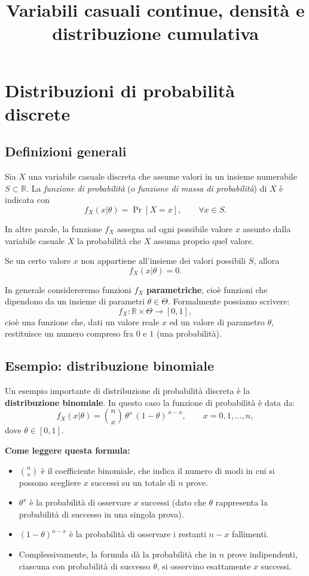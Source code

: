 \documentclass[a4paper,12pt]{article}
\title{Variabili casuali continue, densità e distribuzione cumulativa}
\author{}
\date{}
\begin{document}
	
	\maketitle
	
	\section*{Distribuzioni di probabilità discrete}
	
	\subsection*{Definizioni generali}
	
	Sia $X$ una variabile casuale discreta che assume valori in un insieme numerabile $S \subset \mathbb{R}$.
	La \textit{funzione di probabilità} (o \textit{funzione di massa di probabilità}) di $X$ è indicata con
	\[
	f_X(x|\theta) = \Pr[X = x], \qquad \forall x \in S.
	\]
	
	\noindent
	In altre parole, la funzione $f_X$ assegna ad ogni possibile valore $x$ assunto dalla variabile casuale $X$ la probabilità che $X$ assuma proprio quel valore.
	
	Se un certo valore $x$ non appartiene all’insieme dei valori possibili $S$, allora
	\[
	f_X(x|\theta) = 0.
	\]
	
	In generale considereremo funzioni $f_X$ \textbf{parametriche}, cioè funzioni che dipendono da un insieme di parametri $\theta \in \Theta$. Formalmente possiamo scrivere:
	\[
	f_X : \mathbb{R} \times \Theta \longrightarrow [0,1],
	\]
	cioè una funzione che, dati un valore reale $x$ ed un valore di parametro $\theta$, restituisce un numero compreso fra $0$ e $1$ (una probabilità).
	
	\subsection*{Esempio: distribuzione binomiale}
	
	Un esempio importante di distribuzione di probabilità discreta è la \textbf{distribuzione binomiale}.  
	In questo caso la funzione di probabilità è data da:
	\[
	f_X(x|\theta) = \binom{n}{x} \, \theta^x \, (1-\theta)^{\,n-x}, 
	\qquad x = 0,1,\ldots,n,
	\]
	dove $\theta \in [0,1]$.
	
	\bigskip
	
	\noindent
	\textbf{Come leggere questa formula:}
	\begin{itemize}
		\item $\binom{n}{x}$ è il coefficiente binomiale, che indica il numero di modi in cui si possono scegliere $x$ successi su un totale di $n$ prove.
		\item $\theta^x$ è la probabilità di osservare $x$ successi (dato che $\theta$ rappresenta la probabilità di successo in una singola prova).
		\item $(1-\theta)^{n-x}$ è la probabilità di osservare i restanti $n-x$ fallimenti.
		\item Complessivamente, la formula dà la probabilità che in $n$ prove indipendenti, ciascuna con probabilità di successo $\theta$, si osservino esattamente $x$ successi.
	\end{itemize}
	
\end{document}

